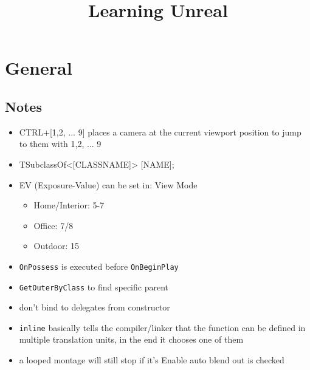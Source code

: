 \documentclass{scrbook}
\author{}
\title{Learning Unreal}
\newcommand{\code}[1]{\colorbox{mygray}{\lstinline|#1|}}
\begin{document}

\maketitle
{
  \hypersetup{linkcolor=black}
  \tableofcontents
}

    \chapter{General}
        \section{Notes}
        \begin{itemize}
            \item CTRL+[{1,2, ... 9}] places a camera at the current viewport position to jump to them with {1,2, ... 9}
            \item TSubclassOf<[CLASSNAME]> [NAME];
            \item EV (Exposure-Value) can be set in: View Mode
            \begin{itemize}
                \item Home/Interior: 5-7
                \item Office: 7/8
                \item Outdoor: 15
            \end{itemize}
            \item \code{OnPossess} is executed before \code{OnBeginPlay}
            \item \code{GetOuterByClass} to find specific parent
            \item don't bind to delegates from constructor
            \item \code{inline} basically tells the compiler/linker that the function can be defined in multiple translation units, in the end it chooses one of them
            \item a looped montage will still stop if it’s Enable auto blend out is checked
        \end{itemize}
\end{document}
